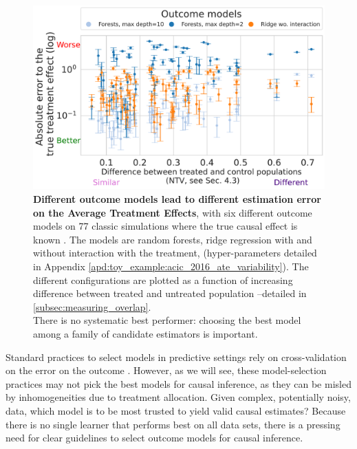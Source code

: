 \documentclass[10pt]{article}
\begin{document}
\begin{multicols}{2}
    \begin{figure}[b!]
        \begin{minipage}{.4\linewidth}
            \caption{\textbf{Different outcome models lead to different
                    estimation error on the Average Treatment Effects},
                with six different outcome
                models on 77 classic simulations where the true causal effect is
                known \cite{dorie_automated_2019}. The models are random forests, ridge regression with and without
                interaction with the treatment,
                (hyper-parameters detailed in Appendix
                \ref{apd:toy_example:acic_2016_ate_variability}). The different configurations are
                plotted as a function of increasing difference between treated and
                untreated population --detailed in
                \autoref{subsec:measuring_overlap}.  \\[1ex]
                There is no systematic best performer: choosing
                the best model among a family of candidate estimators is
                important.
            }\label{fig:acic_2016_ate_heterogeneity}%
        \end{minipage}\hfill%
        \begin{minipage}{.6\linewidth}
            \centering
            \includegraphics[width=0.95\linewidth]{images/2023-03-08-11-10-28_acic_2016_ate_heterogeneity.parquet_abs_bias_ylog_scale=True.pdf}%
        \end{minipage}%
    \end{figure}

    Standard practices to select models in predictive settings rely on
    cross-validation on the error on the outcome
    \cite{poldrack2020establishment,varoquaux2022evaluating}. However, as we
    will see, these model-selection practices may not pick the best models
    for causal inference, as they can be misled by inhomogeneities due to
    treatment allocation.
    Given complex, potentially noisy, data, which model is to be most trusted to
    yield valid causal estimates? Because there is no single learner that performs
    best on all data sets, there is a pressing need for clear guidelines to select
    outcome models for causal inference.


\end{multicols}
\end{document}
